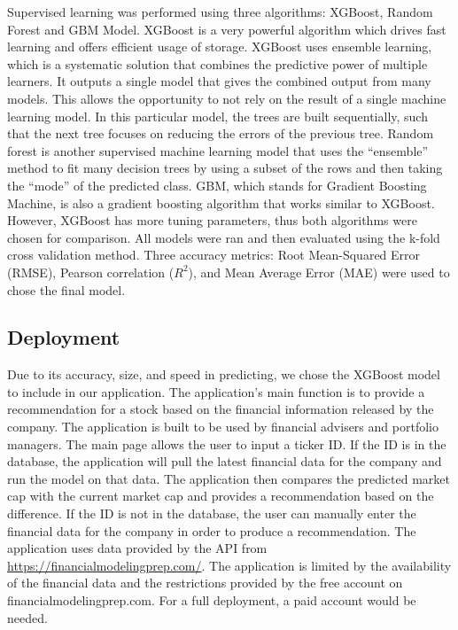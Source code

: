 \documentclass[11pt,]{article}
\begin{document}
Supervised learning was performed using three algorithms: XGBoost,
Random Forest and GBM Model. XGBoost is a very powerful algorithm which
drives fast learning and offers efficient usage of storage. XGBoost uses
ensemble learning, which is a systematic solution that combines the
predictive power of multiple learners. It outputs a single model that
gives the combined output from many models. This allows the opportunity
to not rely on the result of a single machine learning model. In this
particular model, the trees are built sequentially, such that the next
tree focuses on reducing the errors of the previous tree. Random forest
is another supervised machine learning model that uses the ``ensemble''
method to fit many decision trees by using a subset of the rows and then
taking the ``mode'' of the predicted class. GBM, which stands for
Gradient Boosting Machine, is also a gradient boosting algorithm that
works similar to XGBoost. However, XGBoost has more tuning parameters,
thus both algorithms were chosen for comparison. All models were ran and
then evaluated using the k-fold cross validation method. Three accuracy
metrics: Root Mean-Squared Error (RMSE), Pearson correlation (\(R^2\)),
and Mean Average Error (MAE) were used to chose the final model.

\hypertarget{deployment}{%
\subsection{Deployment}\label{deployment}}

Due to its accuracy, size, and speed in predicting, we chose the XGBoost
model to include in our application. The application's main function is
to provide a recommendation for a stock based on the financial
information released by the company. The application is built to be used
by financial advisers and portfolio managers. The main page allows the
user to input a ticker ID. If the ID is in the database, the application
will pull the latest financial data for the company and run the model on
that data. The application then compares the predicted market cap with
the current market cap and provides a recommendation based on the
difference. If the ID is not in the database, the user can manually
enter the financial data for the company in order to produce a
recommendation. The application uses data provided by the API from
\url{https://financialmodelingprep.com/}. The application is limited by
the availability of the financial data and the restrictions provided by
the free account on financialmodelingprep.com. For a full deployment, a
paid account would be needed.
\end{document}
